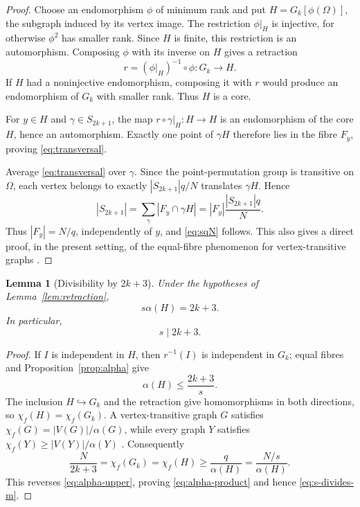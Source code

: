 \documentclass[11pt]{article}
\theoremstyle{plain}
\newtheorem{lemma}[theorem]{Lemma}
\theoremstyle{remark}
\begin{document}
\begin{proof}
Choose an endomorphism $\phi$ of minimum rank and put
$H=G_k[\phi(\Omega)]$, the subgraph induced by its vertex image.  The restriction
$\phi|_H$ is injective, for otherwise
$\phi^2$ has smaller rank.  Since $H$ is finite, this restriction is an
automorphism.  Composing $\phi$ with its inverse on $H$ gives a retraction
\[
 r=(\phi|_H)^{-1}\circ\phi:G_k\to H.
\]
If $H$ had a noninjective endomorphism, composing it with $r$ would produce
an endomorphism of $G_k$ with smaller rank.  Thus $H$ is a core.

For $y\in H$ and $\gamma\in S_{2k+1}$, the map
$r\circ\gamma|_H:H\to H$ is an endomorphism of the core $H$, hence an
automorphism.  Exactly one point of $\gamma H$ therefore lies in the fibre
$F_y$, proving \eqref{eq:transversal}.

Average \eqref{eq:transversal} over $\gamma$.  Since the point-permutation
group is transitive on $\Omega$, each vertex belongs to exactly
$|S_{2k+1}|q/N$ translates $\gamma H$.  Hence
\[
 |S_{2k+1}|=
 \sum_\gamma |F_y\cap\gamma H|
 =|F_y|\frac{|S_{2k+1}|q}{N}.
\]
Thus $|F_y|=N/q$, independently of $y$, and \eqref{eq:sqN} follows.  This
also gives a direct proof, in the present setting, of the equal-fibre
phenomenon for vertex-transitive graphs
\cite{HahnTardif1997,Roberson2013}.
\end{proof}

\begin{lemma}[Divisibility by \texorpdfstring{$2k+3$}{2k+3}]
\label{lem:second-divisor}
Under the hypotheses of Lemma~\ref{lem:retraction},
\begin{equation}\label{eq:alpha-product}
 s\alpha(H)=2k+3.
\end{equation}
In particular,
\begin{equation}\label{eq:s-divides-m}
 s\mid 2k+3.
\end{equation}
\end{lemma}

\begin{proof}
If $I$ is independent in $H$, then $r^{-1}(I)$ is independent in $G_k$;
equal fibres and Proposition~\ref{prop:alpha} give
\begin{equation}\label{eq:alpha-upper}
 \alpha(H)\le\frac{2k+3}{s}.
\end{equation}
The inclusion $H\hookrightarrow G_k$ and the retraction give homomorphisms
in both directions, so $\chi_f(H)=\chi_f(G_k)$.  A vertex-transitive graph
$G$ satisfies $\chi_f(G)=|V(G)|/\alpha(G)$, while every graph $Y$ satisfies
$\chi_f(Y)\ge |V(Y)|/\alpha(Y)$
\cite[Chapters~1--3]{ScheinermanUllman1997}.  Consequently
\[
 \frac{N}{2k+3}=\chi_f(G_k)=\chi_f(H)
 \ge\frac{q}{\alpha(H)}=\frac{N/s}{\alpha(H)}.
\]
This reverses \eqref{eq:alpha-upper}, proving
\eqref{eq:alpha-product} and hence \eqref{eq:s-divides-m}.
\end{proof}
\end{document}

